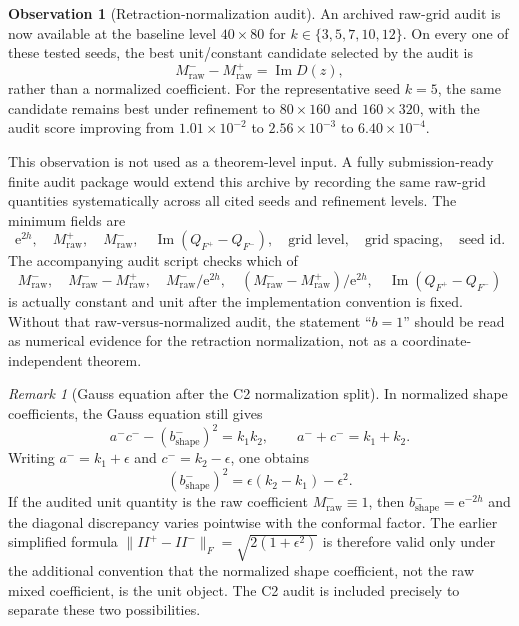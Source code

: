 \documentclass[11pt,a4paper]{article}
\theoremstyle{plain}
\theoremstyle{definition}
\newtheorem{observation}[theorem]{Observation}
\theoremstyle{remark}
\newtheorem{remark}[theorem]{Remark}
\DeclareMathOperator{\Imag}{Im}
\newcommand{\ee}{\mathrm{e}}
\newcommand{\norm}[1]{\lVert #1 \rVert}
\begin{document}
\begin{observation}[Retraction-normalization audit]
\label{obs:DeltaII}
\label{obs:C2-normalization-audit}
\label{obs:b-equals-1-audit}
An archived raw-grid audit is now available at the baseline level
$40\times80$ for $k\in\{3,5,7,10,12\}$.  On every one of these tested
seeds, the best unit/constant candidate selected by the audit is
\[
  M^-_{\mathrm{raw}}-M^+_{\mathrm{raw}}
  = \Imag D(z),
\]
rather than a normalized coefficient.  For the representative seed
$k=5$, the same candidate remains best under refinement to
$80\times160$ and $160\times320$, with the audit score improving from
$1.01\times10^{-2}$ to $2.56\times10^{-3}$ to $6.40\times10^{-4}$.

This observation is not used as a theorem-level input.  A fully
submission-ready finite audit package would extend this archive by
recording the same raw-grid quantities systematically across all cited
seeds and refinement levels.  The minimum fields are
\[
  \ee^{2h},\quad M^+_{\mathrm{raw}},\quad M^-_{\mathrm{raw}},\quad
  \Imag(Q_{F^+}-Q_{F^-}),\quad \text{grid level},\quad
  \text{grid spacing},\quad \text{seed id}.
\]
The accompanying audit script checks which of
\[
  M^-_{\mathrm{raw}},\quad
  M^-_{\mathrm{raw}}-M^+_{\mathrm{raw}},\quad
  M^-_{\mathrm{raw}}/\ee^{2h},\quad
  (M^-_{\mathrm{raw}}-M^+_{\mathrm{raw}})/\ee^{2h},\quad
  \Imag(Q_{F^+}-Q_{F^-})
\]
is actually constant and unit after the implementation convention is
fixed.  Without that raw-versus-normalized audit, the statement
``$b=1$'' should be read as numerical evidence for the retraction
normalization, not as a coordinate-independent theorem.
\end{observation}

\begin{remark}[Gauss equation after the C2 normalization split]
\label{rem:DeltaII-structure}
In normalized shape coefficients, the Gauss equation still gives
\[
  a^-c^- - (b^-_{\mathrm{shape}})^2=k_1k_2,
  \qquad a^-+c^-=k_1+k_2.
\]
Writing $a^-=k_1+\epsilon$ and $c^-=k_2-\epsilon$, one obtains
\[
  (b^-_{\mathrm{shape}})^2
  = \epsilon(k_2-k_1)-\epsilon^2.
\]
If the audited unit quantity is the raw coefficient
$M^-_{\mathrm{raw}}\equiv1$, then
$b^-_{\mathrm{shape}}=\ee^{-2h}$ and the diagonal discrepancy varies
pointwise with the conformal factor.  The earlier simplified formula
$\norm{II^+-II^-}_F=\sqrt{2(1+\epsilon^2)}$ is therefore valid only
under the additional convention that the normalized shape coefficient,
not the raw mixed coefficient, is the unit object.  The C2 audit is
included precisely to separate these two possibilities.
\end{remark}
\end{document}
